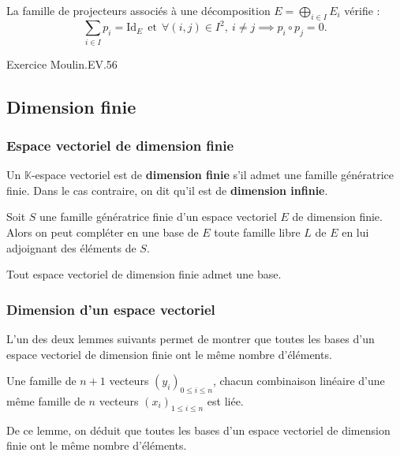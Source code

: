 \documentclass[french]{article}
\newcommand{\K}{\mathbb{K}}
\theoremstyle{plain}
\theoremstyle{definition}
\theoremstyle{remark}
\begin{document}
\begin{prop}
	La famille de projecteurs associés à une décomposition $E=\displaystyle\bigoplus_{i\in I}E_i$ vérifie : $$\sum_{i\in I}p_i=\text{Id}_E\ \ \text{et}\ \ \forall (i,j)\in I^2,\ i\ne j\implies p_i\circ p_j=0.$$
\end{prop}

Exercice Moulin.EV.56

\subsection{Dimension finie}

\subsubsection*{Espace vectoriel de dimension finie}

\begin{dfn}
	Un $\K$-espace vectoriel est de \textbf{dimension finie} s'il admet une famille génératrice finie. Dans le cas contraire, on dit qu'il est de \textbf{dimension infinie}.
\end{dfn}

\begin{thm}%
	Soit $S$ une famille génératrice finie d'un espace vectoriel $E$ de dimension finie. Alors on peut compléter en une base de $E$ toute famille libre $L$ de $E$ en lui adjoignant des éléments de $S$.
\end{thm}

\begin{cor}%
	Tout espace vectoriel de dimension finie admet une base.
\end{cor}

\subsubsection*{Dimension d'un espace vectoriel}
L'un des deux lemmes suivants permet de montrer que toutes les bases d'un espace vectoriel de dimension finie ont le même nombre d'éléments.

\begin{lem}%
	Une famille de $n+1$ vecteurs $(y_i)_{0\leqslant i\leqslant n}$, chacun combinaison linéaire d'une même famille de $n$ vecteurs $(x_i)_{1\leqslant i\leqslant n}$ est liée.
\end{lem}

De ce lemme, on déduit que toutes les bases d'un espace vectoriel de dimension finie ont le même nombre d'éléments.
\end{document}
